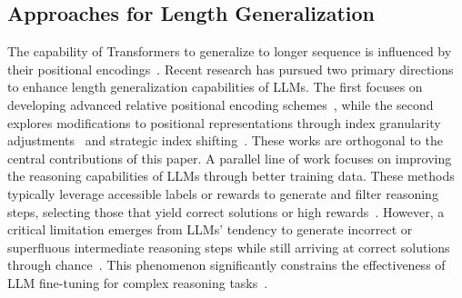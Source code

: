 \subsection{Approaches for Length Generalization}

The capability of Transformers to generalize to longer sequence is influenced by their positional encodings~\citep{alibi}. Recent research has pursued two primary directions to enhance length generalization capabilities of LLMs. The first focuses on developing advanced relative positional encoding schemes~\citep{raffel2020exploring,alibi,chi2022kerple,sun2022length,chi2023dissecting,li2024functional}, while the second explores modifications to positional representations through index granularity adjustments~\cite{chen2023extending,peng2024yarn} and strategic index shifting~\cite{ruoss2023randomized,zhu2024pose}. These works are orthogonal to the central contributions of this paper. 
A parallel line of work focuses on improving the reasoning capabilities of LLMs through better training data. These methods typically leverage accessible labels or rewards to generate and filter reasoning steps, selecting those that yield correct solutions or high rewards~\cite{zelikman2022star,yuan2024scaling,singh2024beyond,hosseini2024vstar}. However, a critical limitation emerges from LLMs' tendency to generate incorrect or superfluous intermediate reasoning steps while still arriving at correct solutions through chance~\cite{debjit2024making}. This phenomenon significantly constrains the effectiveness of LLM fine-tuning for complex reasoning tasks~\cite{xia2024less,zhou2023lima}.